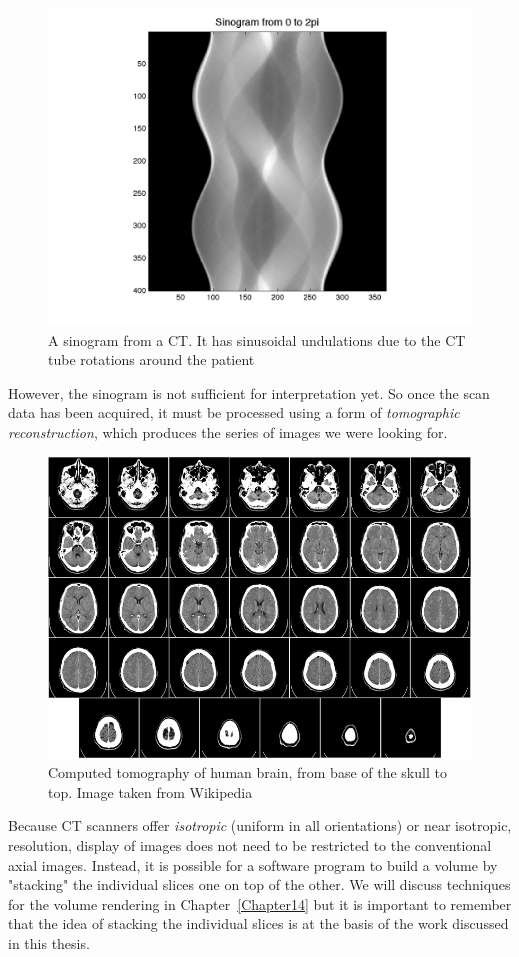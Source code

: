 \begin{figure}[htb] %
   \centering
   \includegraphics[width=0.45\linewidth]{images/sinogram.png}
   \caption[Sinogram]{A sinogram from a CT. It has sinusoidal undulations due to the CT tube rotations around the patient}
   \label{fig:sinogram}
\end{figure}

However, the sinogram is not sufficient for interpretation yet. So once the scan data has been acquired, it must be processed using a form of \textit{tomographic reconstruction}, which produces the series of images we were looking for.

\begin{figure}[htb] %
   \centering
   \includegraphics[width=0.45\linewidth]{images/Computed_tomography_of_human_brain.png}
   \caption[Computed tomography of human brain]{Computed tomography of human brain, from base of the skull to top. Image taken from Wikipedia}
   \label{fig:brainCT}
\end{figure}

Because CT scanners offer \textit{isotropic} (uniform in all orientations) or near isotropic, resolution, display of images does not need to be restricted to the conventional axial images. Instead, it is possible for a software program to build a volume by "stacking" the individual slices one on top of the other. We will discuss techniques for the volume rendering in Chapter~\ref{Chapter14} but it is important to remember that the idea of stacking the individual slices is at the basis of the work discussed in this thesis.

